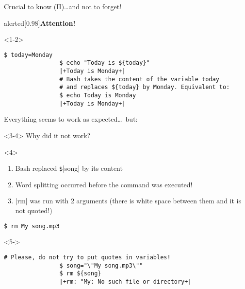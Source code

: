 \begin{frame}[fragile]{Crucial to know (II)}{\ldots{}and not to forget!}
    \begin{overlayarea}{\textwidth}{0.5\textheight}
        \vspace{-9mm}
        \begin{varblock}{alerted}[0.98\textwidth]{\textbf{Attention!}}
        \end{varblock}
        \begin{onlyenv}<1-2>
            \begin{lstlisting}[style=MyBash, belowskip=-4mm]
                $ today=Monday
                $ echo "Today is ${today}"
                |+Today is Monday+|
                # Bash takes the content of the variable today
                # and replaces ${today} by Monday. Equivalent to:
                $ echo Today is Monday
                |+Today is Monday+|
            \end{lstlisting}
            \centerline{Everything seems to work as expected\ldots\ but:}
        \end{onlyenv}
        \begin{onlyenv}<3-4>
            Why did it not work?
        \end{onlyenv}
        \begin{onlyenv}<4>
            \begin{enumerate}
                \item Bash replaced \texttt{\$}\bash|{song}| by its content
                \item Word splitting occurred before the command was executed!
                \item \bash|rm| was run with 2 arguments (there is white space between them and it is not quoted!)
            \end{enumerate}
            \begin{lstlisting}[style=MyBash, numbers=none]
                $ rm My song.mp3
            \end{lstlisting}
        \end{onlyenv}
        \begin{onlyenv}<5->
            \begin{lstlisting}[style=MyBash]
                # Please, do not try to put quotes in variables!
                $ song="\"My song.mp3\""
                $ rm ${song}
                |+rm: "My: No such file or directory+|

\end{lstlisting}
\end{onlyenv}
\end{overlayarea}
\end{frame}
